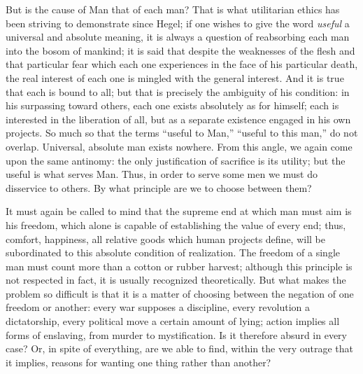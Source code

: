\documentclass[11pt]{article}
\begin{document}
{{But is the cause of Man that of each man? That is what utilitarian ethics has been striving to demonstrate since Hegel; if one wishes to give the word \textit{useful} a universal and absolute meaning, it is always a question of reabsorbing each man into the bosom of mankind; it is said that despite the weaknesses of the flesh and that particular fear which each one experiences in the face of his particular death, the real interest of each one is mingled with the general interest. And it is true that each is bound to all; but that is precisely the ambiguity of his condition: in his surpassing toward others, each one exists absolutely as for himself; each is interested in the liberation of all, but as a separate existence engaged in his own projects. So much so that the terms “useful to Man,” “useful to this man,” do not overlap. Universal, absolute man exists nowhere. From this angle, we again come upon the same antinomy: the only justification of sacrifice is its utility; but the useful is what serves Man. Thus, in order to serve some men we must do disservice to others. By what principle are we to choose between them?

It must again be called to mind that the supreme end at which man must aim is his freedom, which alone is capable of establishing the value of every end; thus, comfort, happiness, all relative goods which human projects define, will be subordinated to this absolute condition of realization. The freedom of a single man must count more than a cotton or rubber harvest; although this principle is not respected in fact, it is usually recognized theoretically. But what makes the problem so difficult is that it is a matter of choosing between the negation of one freedom or another: every war supposes a discipline, every revolution a dictatorship, every political move a certain amount of lying; action implies all forms of enslaving, from murder to mystification. Is it therefore absurd in every case? Or, in spite of everything, are we able to find, within the very outrage that it implies, reasons for wanting one thing rather than another?

}}
\end{document}

